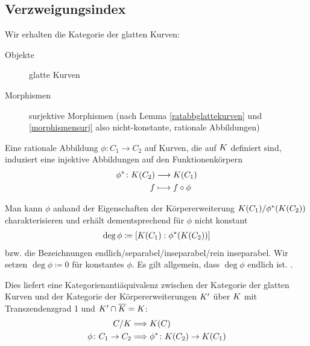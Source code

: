 
\subsection{Verzweigungsindex}
\begin{Bemerkung}
  Wir erhalten die Kategorie der glatten Kurven:
  \begin{description}
  \item[Objekte] glatte Kurven
  \item[Morphismen] surjektive Morphismen (nach Lemma
    \ref{ratabbglattekurven} und \ref{morphismensurj} also
    nicht-konstante, rationale Abbildungen)
  \end{description}
\end{Bemerkung}

\begin{Bemerkung}[Kategorienäquivalenz]\label{kategorienaequivalenz}
  Eine rationale Abbildung $\phi\colon C_1\to C_2$ auf Kurven, die auf
  $K$ definiert sind,
  induziert eine injektive Abbildungen auf den Funktionenkörpern
  \begin{align*}
    \phi^* \colon K(C_2) &\longrightarrow K(C_1)\\
    f &\longmapsto f\circ \phi
  \end{align*}

  Man kann $\phi$ anhand der Eigenschaften der Körpererweiterung
  $K(C_1)/\phi^*(K(C_2))$ charakterisieren und erhält
  dementsprechend für $\phi$ nicht konstant
  \begin{gather*}
    \deg\phi \coloneqq \left[ K(C_1) : \phi^*(K(C_2)) \right]
  \end{gather*}
  bzw. die Bezeichnungen endlich/separabel/inseparabel/rein
  inseparabel.
  Wir setzen $\deg\phi\coloneqq 0$ für konstantes $\phi$.
  Es gilt allgemein, dass $\deg\phi$ endlich ist.
  \cite[siehe][Theorem 2.4 (a)]{silverman}.

  Dies liefert eine Kategorienantiäquivalenz zwischen der Kategorie der
  glatten Kurven und der Kategorie der Körpererweiterungen $K'$ über $K$
  mit Transzendenzgrad 1 und $K'\cap\overline K=K$:
  \begin{align*}
    C/K &\Longrightarrow K(C)\\
    \phi\colon C_1\to C_2 &\Longrightarrow \phi^*\colon K(C_2)\to K(C_1)
  \end{align*}
  
\end{Bemerkung}

